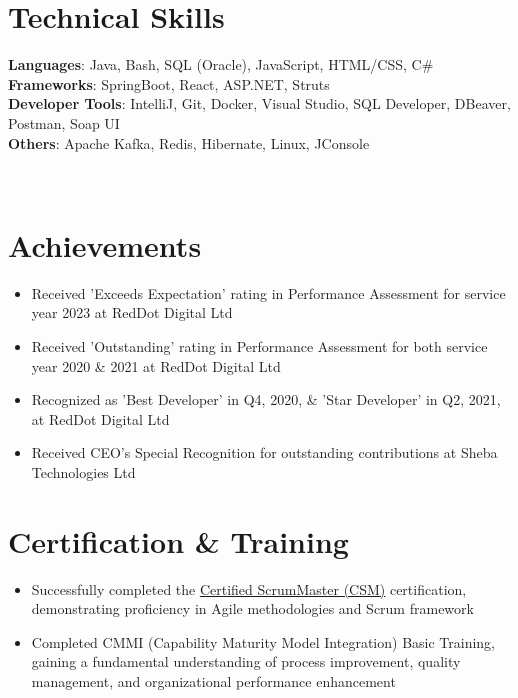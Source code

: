 \documentclass[letterpaper,11pt]{article}
\newcommand{\resumeItem}[1]{
  \item\small{
    {#1 \vspace{-2pt}}
  }
}
\newcommand{\resumeItemListStart}{\begin{itemize}}
\newcommand{\resumeItemListEnd}{\end{itemize}\vspace{-5pt}}
\begin{document}
\section{Technical Skills}
 \begin{itemize}[leftmargin=0.15in, label={}]
    \small{\item{
     \textbf{Languages}{: Java, Bash, SQL (Oracle), JavaScript, HTML/CSS, C\#} \\
     \textbf{Frameworks}{: SpringBoot, React, ASP.NET, Struts} \\
     \textbf{Developer Tools}{: IntelliJ, Git, Docker, Visual Studio, SQL Developer, DBeaver, Postman, Soap UI} \\
     \textbf{Others}{: Apache Kafka, Redis, Hibernate, Linux, JConsole}
    }} \\
    
 \end{itemize}

\section{Achievements}
    \resumeItemListStart
        \resumeItem{Received 'Exceeds Expectation' rating in Performance Assessment for service year 2023 at RedDot Digital Ltd}
        \resumeItem{Received 'Outstanding' rating in Performance Assessment for both service year 2020 \& 2021 at RedDot Digital Ltd}
        \resumeItem{Recognized as 'Best Developer' in Q4, 2020, \& 'Star Developer' in Q2, 2021, at RedDot Digital Ltd}
        \resumeItem{Received CEO's Special Recognition for outstanding contributions at Sheba Technologies Ltd}
      \resumeItemListEnd
%

\section{Certification \& Training}
    \resumeItemListStart
        \resumeItem{Successfully completed the \href{https://bcert.me/bc/html/show-badge.html?b=iddgrcfg}{\underline{Certified ScrumMaster (CSM)}} certification, demonstrating proficiency in Agile methodologies and Scrum framework}
        \resumeItem{Completed CMMI (Capability Maturity Model Integration) Basic Training, gaining a fundamental understanding of process improvement, quality management, and organizational performance enhancement}
      \resumeItemListEnd
%

\end{document}
